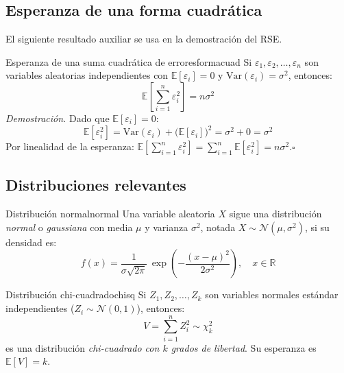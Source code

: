 \documentclass[12pt, a4paper]{article}
\newcommand{\E}[1]{\mathbb{E}\!\left[#1\right]}
\newcommand{\Var}[1]{\mathrm{Var}\!\left(#1\right)}
\newcommand{\sumni}{\sum_{i=1}^{n}}
\begin{document}
\bigskip

\subsection{Esperanza de una forma cuadrática}

El siguiente resultado auxiliar se usa en la demostración del RSE.

\begin{proposicion}{Esperanza de una suma cuadrática de errores}{formacuad}
Si $\varepsilon_1, \varepsilon_2, \ldots, \varepsilon_n$ son variables
aleatorias independientes con $\E{\varepsilon_i} = 0$ y
$\Var{\varepsilon_i} = \sigma^2$, entonces:
\[
  \E{\sumni \varepsilon_i^2} = n\sigma^2
\]
\textit{Demostración.} Dado que $\E{\varepsilon_i} = 0$:
\[
  \E{\varepsilon_i^2}
    = \Var{\varepsilon_i} + \bigl(\E{\varepsilon_i}\bigr)^2
    = \sigma^2 + 0 = \sigma^2
\]
Por linealidad de la esperanza:
$\displaystyle\E{\sumni \varepsilon_i^2} = \sumni \E{\varepsilon_i^2} = n\sigma^2$.\hfill$\square$
\end{proposicion}

\bigskip

\subsection{Distribuciones relevantes}

\begin{definicion}{Distribución normal}{normal}
Una variable aleatoria $X$ sigue una distribución \emph{normal} o
\emph{gaussiana} con media $\mu$ y varianza $\sigma^2$, notada
$X \sim \mathcal{N}(\mu, \sigma^2)$, si su densidad es:
\[
  f(x) = \frac{1}{\sigma\sqrt{2\pi}}\,
    \exp\!\left(-\frac{(x-\mu)^2}{2\sigma^2}\right),
  \quad x \in \mathbb{R}
\]
\end{definicion}

\begin{definicion}{Distribución chi-cuadrado}{chisq}
Si $Z_1, Z_2, \ldots, Z_k$ son variables normales estándar independientes
($Z_i \sim \mathcal{N}(0,1)$), entonces:
\[
  V = \sumni Z_i^2 \sim \chi^2_k
\]
es una distribución \emph{chi-cuadrado con $k$ grados de libertad}.
Su esperanza es $\E{V} = k$.
\end{definicion}
\end{document}
